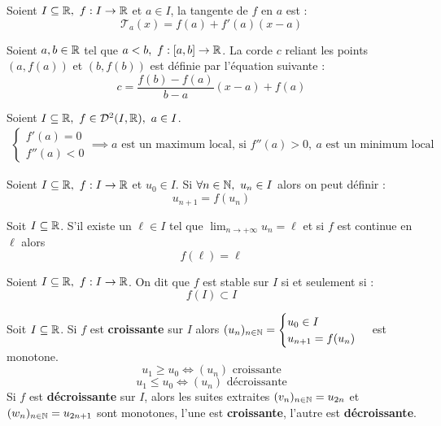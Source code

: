 \begin{proposition}
	Soient $I \subseteq \mathbb{R},\ f : I \to \mathbb{R}$ et $a \in I$, la tangente de $f$ en $a$ est :
	\[ \mathcal{T}_a(x) = f(a) + f'(a)(x - a) \]
\end{proposition}

\begin{proposition}
	Soient $a, b \in \mathbb{R}$ tel que $a < b,\ f : [a, b] \to \mathbb{R}$.
	La corde $c$ reliant les points $(a, f(a))$ et $(b, f(b))$ est définie par l'équation suivante :
	\[ c = \frac{f(b) - f(a)}{b - a} (x - a) + f(a) \]
\end{proposition}

\begin{proposition}
	Soient $I \subseteq \mathbb{R},\ f \in \mathcal{D}^2(I, \mathbb{R}),\ a \in I$.
	\begin{align*}
		\begin{cases}
			f'(a) = 0 \\
			f''(a) < 0
		\end{cases}
		\implies a \text{ est un maximum local, si } f''(a) > 0,\ a \text{  est un minimum local}
	\end{align*}
\end{proposition}

\begin{definition}
	Soient $I \subseteq \mathbb{R},\ f : I \to \mathbb{R}$ et $u_0 \in I$.
	Si $\forall n \in \mathbb{N},\ u_n \in I$ alors on peut définir :
	\[ u_{n + 1} = f(u_n) \]
\end{definition}

\begin{lemma}
	Soit $I \subseteq \mathbb{R}$. S'il existe un $\ell \in I$ tel que $\lim_{n \to +\infty} u_n = \ell$ et si $f$ est continue en $\ell$ alors 
	\[ f(\ell) = \ell \]
\end{lemma}

\begin{definition}
	Soient $I \subseteq \mathbb{R},\ f : I \to \mathbb{R}$. On dit que $f$ est stable sur $I$ si et seulement si : 
	\[ f(I) \subset I \]
\end{definition}

\begin{proposition}
	Soit $I \subseteq \mathbb{R}$.
	Si $f$ est \textbf{croissante} sur $I$ alors 
	$
	(u_n)_{n \in \mathbb{N}} = 
	\begin{cases}
		u_0 \in I \\
		u_{n + 1} = f(u_n)
	\end{cases}
	$
	est monotone.
	\[ u_1 \geq u_0 \iff (u_n) \text{ croissante} \]
	\[ u_1 \leq u_0 \iff (u_n) \text{ décroissante} \]
	Si $f$ est \textbf{décroissante} sur $I$, alors les suites extraites $(v_n)_{n \in \mathbb{N}} = u_{2n}$ et $(w_n)_{n \in \mathbb{N}} = u_{2n + 1}$ sont monotones, l'une est \textbf{croissante}, l'autre est \textbf{décroissante}.
\end{proposition}

